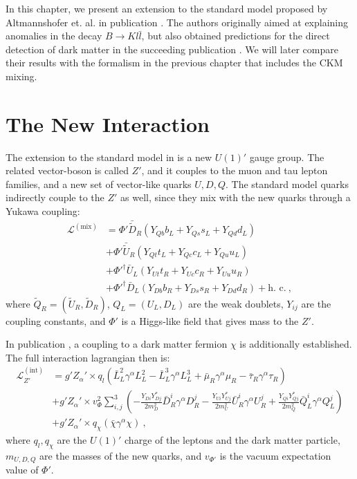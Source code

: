 In this chapter, we present an extension to the standard model proposed by Altmannshofer et. al. in publication \cite{InColour}. The authors originally aimed at explaining anomalies in the decay $B\rightarrow Kl\bar{l}$, but also obtained predictions for the direct detection of dark matter in the succeeding publication \cite{Z}. We will later compare their results with the formalism in the previous chapter that includes the CKM mixing.

\section{The New Interaction}
The extension to the standard model in \cite{InColour} is a new $U(1)'$ gauge group. The related vector-boson is called $Z'$, and it couples to the muon and tau lepton families, and a new set of vector-like quarks $U,D,Q$. The standard model quarks indirectly couple to the $Z'$ as well, since they mix with the new quarks through a Yukawa coupling:
\begin{align*}
	\mathcal{L}^{(\text{mix})} &= \Phi' \bar{\tilde{D}}_R(Y_{Qb}b_L + Y_{Qs}s_L + Y_{Qd}d_L) \\
	&+ \Phi'\bar{\tilde{U}}_R(Y_{Qt}t_L + Y_{Qc}c_L + Y_{Qu}u_L) \\
	&+ \Phi'^\dagger\bar{U}_L(Y_{Ut}t_R + Y_{Uc}c_R + Y_{Uu}u_R) \\
	&+ \Phi'^\dagger\bar{D}_L(Y_{Db}b_R + Y_{Ds}s_R + Y_{Dd}d_R) +\text{h. c.} \ ,
\end{align*}
where $\tilde{Q}_R = (\tilde{U}_R,\tilde{D}_R)$, $Q_L = (U_L,D_L)$ are the weak doublets, $Y_{ij}$ are the coupling constants, and $\Phi'$ is a Higgs-like field that gives mass to the $Z'$.


In publication \cite{Z}, a coupling to a dark matter fermion $\chi$ is additionally established. The full interaction lagrangian then is:
\begin{align*}
	\mathcal{L}^{(\text{int})}_{Z'} &= g'Z_\alpha'\times q_l\left(\bar{L}_L^2\gamma^\alpha L_L^2 - \bar{L}_L^3\gamma^\alpha L_L^3 + \bar{\mu}_R\gamma^\alpha\mu_R-\bar{\tau}_R\gamma^\alpha\tau_R\right) \\
	&+ g'Z_\alpha'\times v_\Phi^2\sum_{i,j}^3\left(-\frac{Y_{Di}Y^*_{Dj}}{2m_D^2}\bar{D}_R^i\gamma^\alpha D_R^j - \frac{Y_{Ui}Y^*_{Uj}}{2m_U^2}\bar{U}_R^i\gamma^\alpha U_R^j + \frac{Y_{Qi}Y_{Qj}^*}{2m_Q^2}\bar{Q}_L^i\gamma^\alpha Q_L^j\right) \\
	&+ g'Z_\alpha'\times q_\chi(\bar{\chi}\gamma^\alpha\chi) \ ,
\end{align*}
where $q_l,q_\chi$ are the $U(1)'$ charge of the leptons and the dark matter particle, $m_{U,D,Q}$ are the masses of the new quarks, and $v_{\Phi'}$ is the vacuum expectation value of $\Phi'$.


